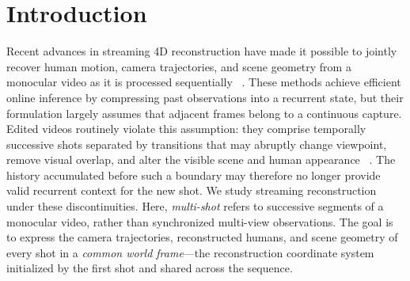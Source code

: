 \section{Introduction}

Recent advances in streaming 4D reconstruction have made it possible to
jointly recover human motion, camera trajectories, and scene geometry from a
monocular video as it is processed sequentially
~\citep{wang2025cut3r,chen2026human3r,sur2026unicon3r}. These methods achieve
efficient online inference by compressing past observations into a recurrent
state, but their formulation largely assumes that adjacent frames belong to a
continuous capture. Edited videos routinely violate this assumption: they
comprise temporally successive shots separated by transitions that may
abruptly change viewpoint, remove visual overlap, and alter the visible scene
and human appearance
~\citep{pavlakos2022multishot,zhang2025humanmm,on2026multithumbs}. The history
accumulated before such a boundary may therefore no longer provide valid
recurrent context for the new shot. We study streaming reconstruction under
these discontinuities. Here, \emph{multi-shot} refers to successive segments
of a monocular video, rather than synchronized multi-view observations. The
goal is to express the camera trajectories, reconstructed humans, and scene
geometry of every shot in a \emph{common world frame}---the reconstruction
coordinate system initialized by the first shot and shared across the
sequence.

